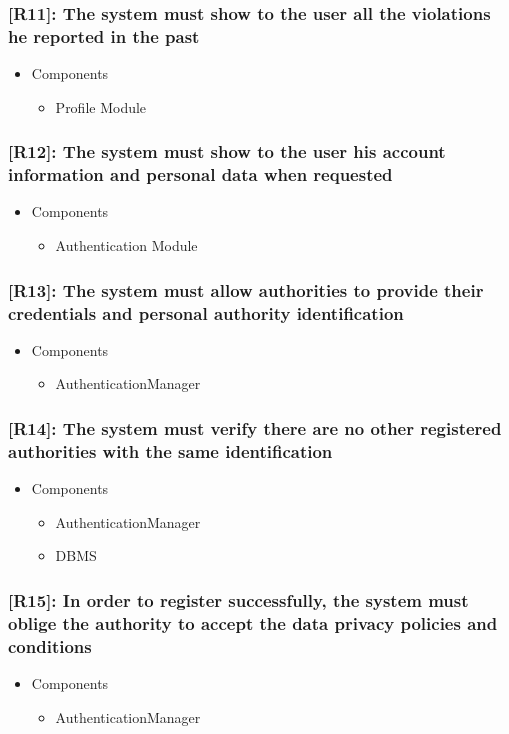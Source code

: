\documentclass[12pt,a4paper]{article}
\begin{document}
\subsubsection*{[R11]: The system must show to the user all the violations he reported in the past}
\begin{itemize}
\item Components
\begin{itemize}
\item Profile Module
\end{itemize}
\end{itemize}
\subsubsection*{[R12]: The system must show to the user his account information and personal data when requested}
\begin{itemize}
\item Components
\begin{itemize}
\item Authentication Module
\end{itemize}
\end{itemize}
\subsubsection*{[R13]: The system must allow authorities to provide their credentials and personal authority identification}
\begin{itemize}
\item Components
\begin{itemize}
\item AuthenticationManager
\end{itemize}
\end{itemize}
\subsubsection*{[R14]: The system must verify there are no other registered authorities with the same identification}
\begin{itemize}
\item Components
\begin{itemize}
\item AuthenticationManager
\item DBMS
\end{itemize}
\end{itemize}
\subsubsection*{[R15]: In order to register successfully, the system must oblige the authority to accept the data privacy policies and conditions}
\begin{itemize}
\item Components
\begin{itemize}
\item AuthenticationManager
\end{itemize}
\end{itemize}
\end{document}
